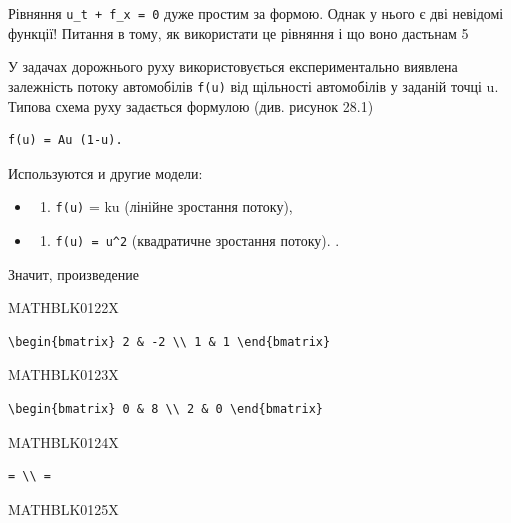 \documentclass[
  ukrainian,
]{article}
\providecommand{\tightlist}{%
  \setlength{\itemsep}{0pt}\setlength{\parskip}{0pt}}
\begin{document}
Рівняння \texttt{u\_t\ +\ f\_x\ =\ 0} дуже простим за формою. Однак у
нього є дві невідомі функції! Питання в тому, як використати це рівняння
і що воно дастьнам 5

У задачах дорожнього руху використовується експериментально виявлена
залежність потоку автомобілів \texttt{f(u)} від щільності автомобілів у
заданій точці u. Типова схема руху задається формулою (див. рисунок
28.1)

\begin{verbatim}
f(u) = Au (1-u).
\end{verbatim}

Используются и другие модели:

\begin{itemize}
\tightlist
\item
  \begin{enumerate}
  \def\labelenumi{\arabic{enumi})}
  \tightlist
  \item
    \texttt{f(u)} = ku (лінійне зростання потоку),
  \end{enumerate}
\item
  \begin{enumerate}
  \def\labelenumi{\arabic{enumi})}
  \setcounter{enumi}{1}
  \tightlist
  \item
    \texttt{f(u)\ =\ u\^{}2} (квадратичне зростання потоку). .
  \end{enumerate}
\end{itemize}

Значит, произведение

MATHBLK0122X

\begin{verbatim}
\begin{bmatrix} 2 & -2 \\ 1 & 1 \end{bmatrix}
\end{verbatim}

MATHBLK0123X

\begin{verbatim}
\begin{bmatrix} 0 & 8 \\ 2 & 0 \end{bmatrix}
\end{verbatim}

MATHBLK0124X

\begin{verbatim}
= \\ =
\end{verbatim}

MATHBLK0125X
\end{document}
